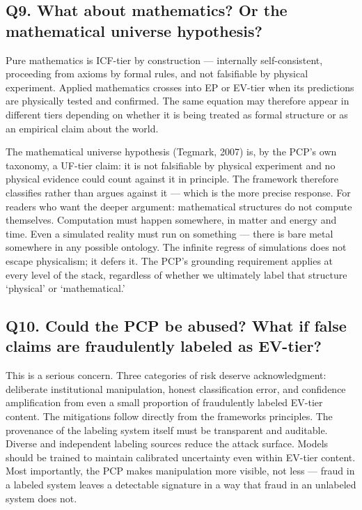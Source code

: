 \documentclass[12pt]{article}
\begin{document}
\subsection{Q9. What about mathematics? Or the mathematical universe
hypothesis?}\label{q9.-what-about-mathematics-or-the-mathematical-universe-hypothesis}

Pure mathematics is ICF-tier by construction --- internally
self-consistent, proceeding from axioms by formal rules, and not
falsifiable by physical experiment. Applied mathematics crosses into EP
or EV-tier when its predictions are physically tested and confirmed. The
same equation may therefore appear in different tiers depending on
whether it is being treated as formal structure or as an empirical claim
about the world.

The mathematical universe hypothesis (Tegmark, 2007) is, by the PCP's
own taxonomy, a UF-tier claim: it is not falsifiable by physical
experiment and no physical evidence could count against it in principle.
The framework therefore classifies rather than argues against it ---
which is the more precise response. For readers who want the deeper
argument: mathematical structures do not compute themselves. Computation
must happen somewhere, in matter and energy and time. Even a simulated
reality must run on something --- there is bare metal somewhere in any
possible ontology. The infinite regress of simulations does not escape
physicalism; it defers it. The PCP's grounding requirement applies at
every level of the stack, regardless of whether we ultimately label that
structure `physical' or `mathematical.'

\subsection{Q10. Could the PCP be abused? What if false claims are
fraudulently labeled as
EV-tier?}\label{q10.-could-the-pcp-be-abused-what-if-false-claims-are-fraudulently-labeled-as-ev-tier}

This is a serious concern. Three categories of risk deserve
acknowledgment: deliberate institutional manipulation, honest
classification error, and confidence amplification from even a small
proportion of fraudulently labeled EV-tier content. The mitigations
follow directly from the framework\textquotesingle s principles. The
provenance of the labeling system itself must be transparent and
auditable. Diverse and independent labeling sources reduce the attack
surface. Models should be trained to maintain calibrated uncertainty
even within EV-tier content. Most importantly, the PCP makes
manipulation more visible, not less --- fraud in a labeled system leaves
a detectable signature in a way that fraud in an unlabeled system does
not.
\end{document}
